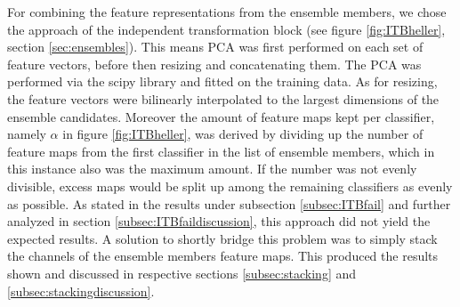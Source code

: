 For combining the feature representations from the ensemble members, we chose the approach of the independent transformation block (see figure \ref{fig:ITBheller}, section \ref{sec:ensembles}). This means 
PCA was first performed on each set of feature vectors, before then resizing and concatenating them. The PCA was performed via the scipy library and fitted on the training data. As for resizing, 
the feature vectors were bilinearly interpolated to the largest dimensions of the ensemble candidates. Moreover the amount of feature maps kept per classifier, namely $\alpha$ in figure \ref{fig:ITBheller}, 
was derived by dividing up the number of feature maps from the first classifier in the list of ensemble members, which in this instance also was the maximum amount. If the number 
was not evenly divisible, excess maps would be split up among the remaining classifiers as evenly as possible.\newline
As stated in the results under subsection \ref{subsec:ITBfail} and further analyzed in section \ref{subsec:ITBfaildiscussion}, this approach did not yield the expected results. 
A solution to shortly bridge this problem was to simply stack the channels of the ensemble members feature maps. This produced the results shown and discussed in respective 
sections \ref{subsec:stacking} and \ref{subsec:stackingdiscussion}.


